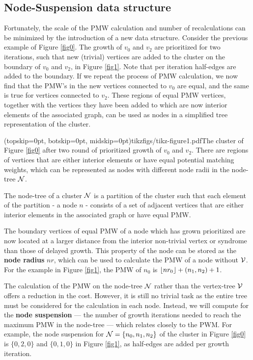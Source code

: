 \subsection{Node-Suspension data structure}\label{sec:nodeset}

Fortunately, the scale of the PMW calculation and number of recalculations can be minimized by the introduction of a new data structure. Consider the previous example of Figure \ref{fig0}. The growth of $v_0$ and $v_2$ are prioritized for two iterations, such that new (trivial) vertices are added to the cluster on the boundary of $v_0$ and $v_2$, in Figure \ref{fig1}. Note that per iteration half-edges are added to the boundary. If we repeat the process of PMW calculation, we now find that the PMW's in the new vertices connected to $v_0$ are equal, and the same is true for vertices connected to $v_2$. These regions of equal PMW vertices, together with the vertices they have been added to which are now interior elements of the associated graph, can be used as nodes in a simplified tree representation of the cluster. 

\Figure[htb](topskip=0pt, botskip=0pt, midskip=0pt){tikzfigs/tikz-figure1.pdf}{The cluster of Figure \ref{fig0} after two round of prioritized growth of $v_0$ and $v_2$. There are regions of vertices that are either interior elements or have equal potential matching weights, which can be represented as nodes with different node radii in the node-tree $\mathcal{N}$. \label{fig1}}

\begin{definition}
  The node-tree of a cluster $\mathcal{N}$ is a partition of the cluster such that each element of the partition - a node $n$ - consists of a set of adjacent vertices that are either interior elements in the associated graph or have equal PMW. 
\end{definition}

The boundary vertices of equal PMW of a node which has grown prioritized are now located at a larger distance from the interior non-trivial vertex or syndrome than those of delayed growth. This property of the node can be stored as the \textbf{node radius} $nr$, which can be used to calculate the PMW of a node without $\mathcal{V}$. For the example in Figure \ref{fig1}, the PMW of $n_0$ is ${\left \lfloor nr_0 \right \rfloor } + (n_1, n_2) + 1$.

The calculation of the PMW on the node-tree $\mathcal{N}$ rather than the vertex-tree $\mathcal{V}$ offers a reduction in the cost. However, it is still no trivial task as the entire tree must be considered for the calculation in each node. Instead, we will compute for the \textbf{node suspension} --- the number of growth iterations needed to reach the maximum PMW in the node-tree --- which relates closely to the PWM. For example, the node suspension for $\mathcal{N} = \{n_0, n_1, n_2\}$ of the cluster in Figure \ref{fig0} is $\{0, 2, 0\}$ and $\{0, 1, 0\}$ in Figure \ref{fig1}, as half-edges are added per growth iteration. 

